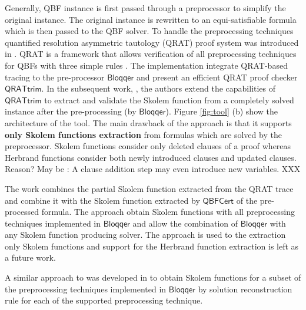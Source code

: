 \documentclass[runningheads]{llncs}
\newcommand{\qtrim}{\mathsf{QRATtrim}}
\newcommand{\bloqqer}{\mathsf{Bloqqer}}
\newcommand{\cheskol}{\mathsf{cheskol}}
\newcommand{\0}{0}
\newcommand{\1}{1}
\def\qcert{\mathsf{QBFCert}}
\begin{document}
Generally, QBF instance is first passed through a preprocessor to simplify the original instance. The original instance is rewritten to an equi-satisfiable formula which is then passed to the QBF solver. To handle the preprocessing techniques quantified resolution asymmetric tautology (QRAT) proof system was introduced in \cite{HeuleSB14a}. QRAT is a framework that allows verification of all preprocessing techniques for QBFs with three simple rules \cite{HeuleSB14a}. The implementation integrate QRAT-based tracing to the pre-processor $\bloqqer$ \cite{Biere2011} and present an efficient QRAT proof checker $\qtrim$.
In the subsequent work, \cite{HeuleSB14}, the authors extend the capabilities of $\qtrim$ to extract and validate the Skolem function from a completely solved instance after the pre-processing (by $\bloqqer$). 
Figure \ref{fig:tool} (b) show the architecture of the tool.
The main drawback of the approach is that it supports \textbf{only Skolem functions extraction} from formulas which are solved by the preprocessor. Skolem functions consider only deleted clauses of a proof whereas Herbrand functions consider both newly introduced clauses and updated clauses. Reason? May be : A clause addition step may even introduce new variables. XXX


The work \cite{FazekasHSB17} combines the partial Skolem function extracted from the QRAT trace and combine it with the Skolem function extracted by $\qcert$ of the pre-processed formula. The approach obtain Skolem functions with
all preprocessing techniques implemented in  $\bloqqer$ and allow the combination of $\bloqqer$ with any Skolem function producing solver. The approach is used to the extraction only Skolem functions and support for the Herbrand function extraction is left as a future work.

A similar approach to  \cite{FazekasHSB17} was developed in \cite{JanotaGM13} to obtain Skolem functions for a subset of the preprocessing techniques implemented in $\bloqqer$ by solution reconstruction rule for each of the supported preprocessing technique.
\end{document}
